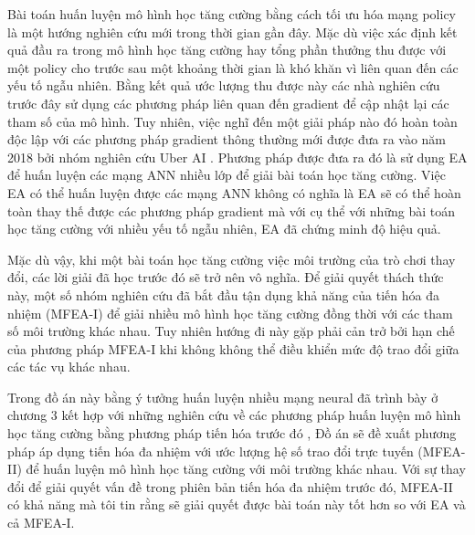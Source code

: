 Bài toán huấn luyện mô hình học tăng cường bằng cách tối ưu hóa mạng policy là một hướng nghiên cứu mới trong thời gian gần đây. Mặc dù việc xác định kết quả đầu ra trong mô hình học tăng cường hay tổng phần thưởng thu được với một policy cho trước sau một khoảng thời gian là khó khăn vì liên quan đến các yếu tố ngẫu nhiên. Bằng kết quả ước lượng thu được này các nhà nghiên cứu trước đây sử dụng các phương pháp liên quan đến gradient \cite{jansen2015analyzing} để cập nhật lại các tham số của mô hình. Tuy nhiên, việc nghĩ đến một giải pháp nào đó hoàn toàn độc lập với các phương pháp gradient thông thường mới được đưa ra vào năm 2018 bởi nhóm nghiên cứu Uber AI \cite{such2017deep}. Phương pháp được đưa ra đó là sử dụng EA để huấn luyện các mạng ANN nhiều lớp để giải bài toán học tăng cường. Việc EA có thể huấn luyện được các mạng ANN không có nghĩa là EA sẽ có thể hoàn toàn thay thế được các phương pháp gradient mà với cụ thể với những bài toán học tăng cường với nhiều yếu tố ngẫu nhiên, EA đã chứng minh độ hiệu quả. 

Mặc dù vậy, khi một bài toán học tăng cường việc môi trường của trò chơi thay đổi, các lời giải đã học trước đó sẽ trở nên vô nghĩa. Để giải quyết thách thức này, một số nhóm nghiên cứu đã bắt đầu tận dụng khả năng của tiến hóa đa nhiệm (MFEA-I) để giải nhiều mô hình học tăng cường đồng thời với các tham số môi trường khác nhau. Tuy nhiên hướng đi này gặp phải cản trở bởi hạn chế của phương pháp MFEA-I khi không không thể điều khiển mức độ trao đổi giữa các tác vụ khác nhau. 

Trong đồ án này bằng ý tưởng huấn luyện nhiều mạng neural đã trình bày ở chương 3 kết hợp với những nghiên cứu về các phương pháp huấn luyện mô hình học tăng cường bằng phương pháp tiến hóa trước đó \cite{such2017deep}, Đồ án sẽ đề xuất phương pháp áp dụng tiến hóa đa nhiệm với ước lượng hệ số trao đổi trực tuyến (MFEA-II) để huấn luyện mô hình học tăng cường với môi trường khác nhau. Với sự thay đổi để giải quyết vấn đề trong phiên bản tiến hóa đa nhiệm trước đó, MFEA-II có khả năng mà tôi tin rằng sẽ giải quyết được bài toán này tốt hơn so với EA và cả MFEA-I.